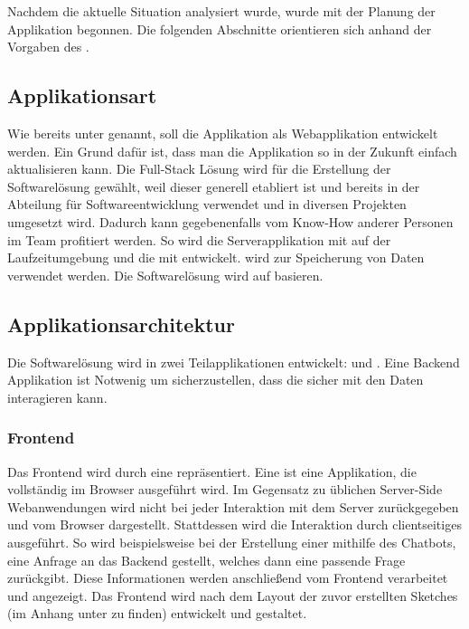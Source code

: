 Nachdem die aktuelle Situation analysiert wurde, wurde mit der Planung der Applikation begonnen. Die folgenden Abschnitte orientieren sich anhand der Vorgaben des .

\subsection{Applikationsart}

Wie bereits unter  genannt, soll die Applikation als Webapplikation entwickelt werden. Ein Grund dafür ist, dass man die Applikation so in der Zukunft
einfach aktualisieren kann. Die Full-Stack Lösung  wird für die Erstellung der Softwarelösung gewählt, weil dieser generell etabliert ist und bereits in der Abteilung für Softwareentwicklung verwendet und in diversen Projekten umgesetzt wird. Dadurch kann gegebenenfalls vom Know-How anderer Personen im Team profitiert werden. So wird die Serverapplikation mit  auf der Laufzeitumgebung  und die  mit  entwickelt. wird zur Speicherung von Daten verwendet werden. Die Softwarelösung wird auf  basieren.

\subsection{Applikationsarchitektur}
\label{sec:Planungsphase:Applikationsarchitektur}

Die Softwarelösung wird in zwei Teilapplikationen entwickelt:  und . Eine Backend Applikation ist Notwenig um sicherzustellen, dass die  sicher mit den Daten interagieren kann.

\subsubsection{Frontend}
\label{sec:Planungsphase:Frontend}

Das Frontend wird durch eine  repräsentiert. Eine  ist eine Applikation, die vollständig im Browser ausgeführt wird.  Im Gegensatz zu üblichen Server-Side Webanwendungen wird nicht bei jeder Interaktion mit dem Server  zurückgegeben und vom Browser dargestellt. Stattdessen wird die Interaktion durch clientseitiges  ausgeführt. 
So wird beispielsweise bei der Erstellung einer  mithilfe des Chatbots, eine Anfrage an das Backend gestellt, welches dann eine passende Frage zurückgibt. Diese Informationen werden anschließend vom Frontend verarbeitet und angezeigt.
Das Frontend wird nach dem Layout der zuvor erstellten Sketches (im Anhang unter  zu finden) entwickelt und gestaltet. 

